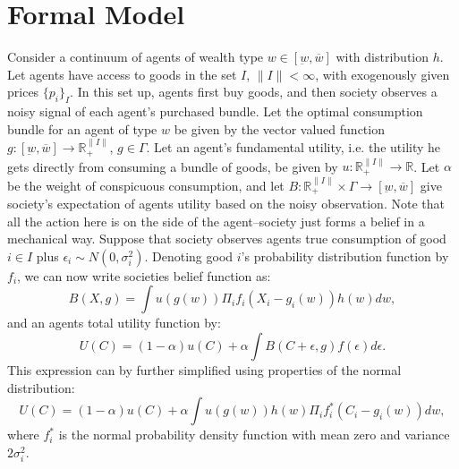 \documentclass[a4paper,10pt]{article}
\begin{document}
\section{Formal Model}
Consider a continuum of agents of wealth type $w\in[\underbar{w},\overline{w}]$ with distribution $h$.  Let agents have access to goods in the set $I$, $\|I\|<\infty$, with exogenously given prices $\{p_i\}_I$.  In this set up, agents first buy goods, and then society observes a noisy signal of each agent's purchased bundle.  Let the optimal consumption bundle for an agent of type $w$ be given by the vector valued function $g:[\underbar{w},\overline{w}]\rightarrow \mathbb{R}_+^{\|I\|}$, $g\in\Gamma$. Let an agent's fundamental utility, i.e. the utility he gets directly from consuming a bundle of goods, be given by $u:\mathbb{R}_+^{\|I\|}\rightarrow \mathbb{R}$.  Let $\alpha$ be the weight of conspicuous consumption, and let $B:\mathbb{R}_+^{\|I\|}\times \Gamma \rightarrow [\underbar{w},\overline{w}]$ give society's expectation of agents utility based on the noisy observation.  Note that all the action here is on the side of the agent--society just forms a belief in a mechanical way.  Suppose that society observes agents true consumption of good $i\in I$ plus $\epsilon_i \sim N(0,\sigma_i^2)$.  Denoting good $i$'s probability distribution function by $f_i$, we can now write societies belief function as:
\begin{equation}
 B(X,g) = \int u(g(w)) \Pi_i f_i(X_i - g_i(w)) h(w) dw, 
\end{equation}
and an agents total utility function by:
\[ 
 U(C) = (1-\alpha) u(C) + \alpha \int B(C+\epsilon,g) f(\epsilon) d\epsilon.
\]
This expression can by further simplified using properties of the normal distribution:
\begin{equation}
 U(C) = (1-\alpha) u(C) + \alpha \int u(g(w)) h(w) \Pi_i f_i^*(C_i-g_i(w)) dw,
\end{equation}
where $f_i^*$ is the normal probability density function with mean zero and variance $2\sigma_i^2$.
\end{document}
